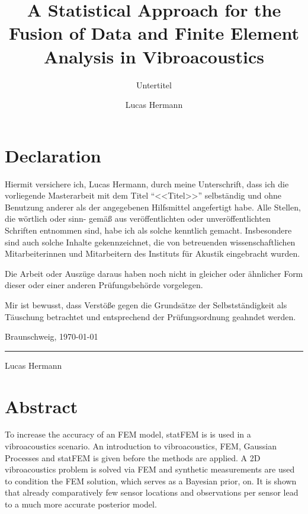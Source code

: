 \documentclass[%
  a4paper,oneside,%
  11pt,%
  smallchapters,
  style=printdev,
  extramargin,
  green,%
  rgb, <cmyk>
  ]{tubsbook}
\title{A Statistical Approach for the Fusion of Data and
Finite Element Analysis in Vibroacoustics}
\subtitle{Untertitel}
\author{Lucas Hermann}
\begin{document}


\chapter*{Declaration}
Hiermit versichere ich, Lucas Hermann, durch meine Unterschrift, dass ich die
vorliegende Masterarbeit mit dem Titel ``<<Titel>>'' selbständig und ohne Benutzung
anderer als der angegebenen Hilfsmittel angefertigt habe. Alle Stellen, die wörtlich oder sinn-
gemäß aus veröffentlichten oder unveröffentlichten Schriften entnommen sind, habe ich als
solche kenntlich gemacht. Insbesondere sind auch solche Inhalte gekennzeichnet, die von
betreuenden wissenschaftlichen Mitarbeiterinnen und Mitarbeitern des Instituts für Akustik eingebracht wurden.

Die Arbeit oder Auszüge daraus haben noch nicht in gleicher oder ähnlicher Form dieser
oder einer anderen Prüfungsbehörde vorgelegen.

Mir ist bewusst, dass Verstöße gegen die Grundsätze der Selbstständigkeit als Täuschung
betrachtet und entsprechend der Prüfungsordnung geahndet werden.

\begin{flushright}
Braunschweig, \today
\end{flushright}

\vspace{2cm}
\hspace{2cm}\rule{5cm}{1pt}

\hspace{2cm}\small{Lucas Hermann} 

\chapter*{Abstract}
To increase the accuracy of an FEM model, statFEM is is used in a vibroacoustics scenario. An introduction to vibroacoustics, FEM, Gaussian Processes and statFEM is given before the methods are applied. A 2D vibroacoustics problem is solved via FEM and synthetic measurements are used to condition the FEM solution, which serves as a Bayesian prior, on. It is shown that already comparatively few sensor locations and observations per sensor lead to a much more accurate posterior model. 
\end{document}
